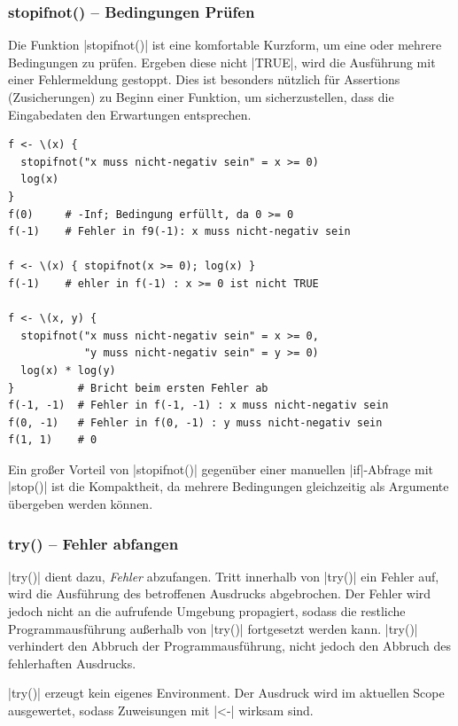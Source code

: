 \documentclass[10pt,twocolumn]{scrartcl}
\renewcommand{\lstinline}{\mycoloredinline}
\begin{document}
\subsubsection{stopifnot() -- Bedingungen Prüfen}

Die Funktion \lstinline|stopifnot()| ist eine komfortable Kurzform, um eine oder mehrere Bedingungen zu prüfen. Ergeben diese nicht \lstinline|TRUE|, wird die Ausführung mit einer Fehlermeldung gestoppt. Dies ist besonders nützlich für Assertions (Zusicherungen) zu Beginn einer Funktion, um sicherzustellen, dass die Eingabedaten den Erwartungen entsprechen.

\begin{lstlisting}
f <- \(x) { 
  stopifnot("x muss nicht-negativ sein" = x >= 0) 
  log(x) 
}
f(0)     # -Inf; Bedingung erfüllt, da 0 >= 0
f(-1)    # Fehler in f9(-1): x muss nicht-negativ sein

f <- \(x) { stopifnot(x >= 0); log(x) }
f(-1)    # ehler in f(-1) : x >= 0 ist nicht TRUE

f <- \(x, y) { 
  stopifnot("x muss nicht-negativ sein" = x >= 0,
            "y muss nicht-negativ sein" = y >= 0) 
  log(x) * log(y)
}          # Bricht beim ersten Fehler ab
f(-1, -1)  # Fehler in f(-1, -1) : x muss nicht-negativ sein
f(0, -1)   # Fehler in f(0, -1) : y muss nicht-negativ sein
f(1, 1)    # 0
\end{lstlisting}

Ein großer Vorteil von \lstinline|stopifnot()| gegenüber einer manuellen \lstinline|if|-Abfrage mit \lstinline|stop()| ist die Kompaktheit, da mehrere Bedingungen gleichzeitig als Argumente übergeben werden können.


\subsubsection{try() -- Fehler abfangen}

\lstinline|try()| dient dazu, \emph{Fehler} abzufangen. Tritt innerhalb von \lstinline|try()| ein Fehler auf, wird die Ausführung des betroffenen Ausdrucks abgebrochen. Der Fehler wird jedoch nicht an die aufrufende Umgebung propagiert, sodass die restliche Programmausführung außerhalb von \lstinline|try()| fortgesetzt werden kann. \lstinline|try()| verhindert den Abbruch der Programmausführung, nicht jedoch den Abbruch des fehlerhaften Ausdrucks.

\lstinline|try()| erzeugt kein eigenes Environment. Der Ausdruck wird im aktuellen Scope ausgewertet, sodass Zuweisungen mit \lstinline|<-| wirksam sind.
\end{document}
